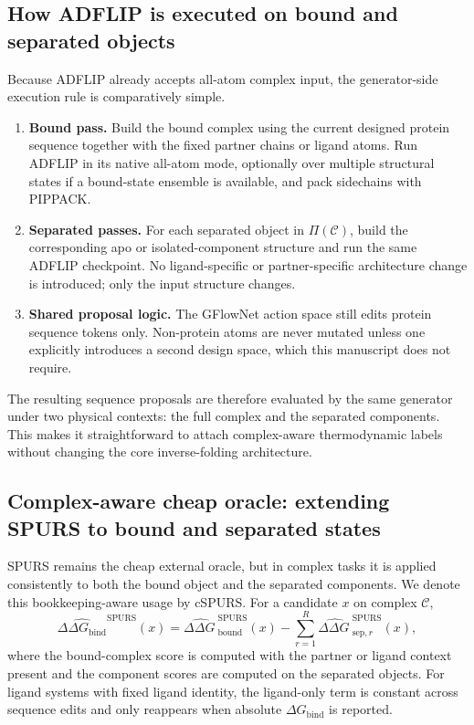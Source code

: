 \documentclass[11pt]{article}
\newcommand{\ddG}{\ensuremath{\Delta\Delta G \ }}
\newcommand{\DGbind}{\ensuremath{\Delta G_{\mathrm{bind}}}}
\newcommand{\ddGbind}{\ensuremath{\Delta\Delta G_{\mathrm{bind}}}}
\begin{document}
	\subsection{How ADFLIP is executed on bound and separated objects}
	
	Because ADFLIP already accepts all-atom complex input, the generator-side execution rule is comparatively simple.
	
	\begin{enumerate}[leftmargin=1.5em]
		\item \textbf{Bound pass.} Build the bound complex using the current designed protein sequence together with the fixed partner chains or ligand atoms. Run ADFLIP in its native all-atom mode, optionally over multiple structural states if a bound-state ensemble is available, and pack sidechains with PIPPACK.
		\item \textbf{Separated passes.} For each separated object in $\Pi(\mathcal{C})$, build the corresponding apo or isolated-component structure and run the same ADFLIP checkpoint. No ligand-specific or partner-specific architecture change is introduced; only the input structure changes.
		\item \textbf{Shared proposal logic.} The GFlowNet action space still edits protein sequence tokens only. Non-protein atoms are never mutated unless one explicitly introduces a second design space, which this manuscript does not require.
	\end{enumerate}
	
	The resulting sequence proposals are therefore evaluated by the same generator under two physical contexts: the full complex and the separated components. This makes it straightforward to attach complex-aware thermodynamic labels without changing the core inverse-folding architecture.
	
	
	\subsection{Complex-aware cheap oracle: extending SPURS to bound and separated states}
	
	SPURS remains the cheap external oracle, but in complex tasks it is applied consistently to both the bound object and the separated components. We denote this bookkeeping-aware usage by cSPURS. For a candidate $x$ on complex $\mathcal{C}$,
	\begin{equation}
		\label{eq:spursbind_cx}
		\widehat{\ddGbind}^{\mathrm{SPURS}}(x)=\widehat{\ddG}^{\mathrm{SPURS}}_{\mathrm{bound}}(x)-\sum_{r=1}^{R}\widehat{\ddG}^{\mathrm{SPURS}}_{\mathrm{sep},r}(x),
	\end{equation}
	where the bound-complex score is computed with the partner or ligand context present and the component scores are computed on the separated objects. For ligand systems with fixed ligand identity, the ligand-only term is constant across sequence edits and only reappears when absolute \DGbind{} is reported.
	
\end{document}
